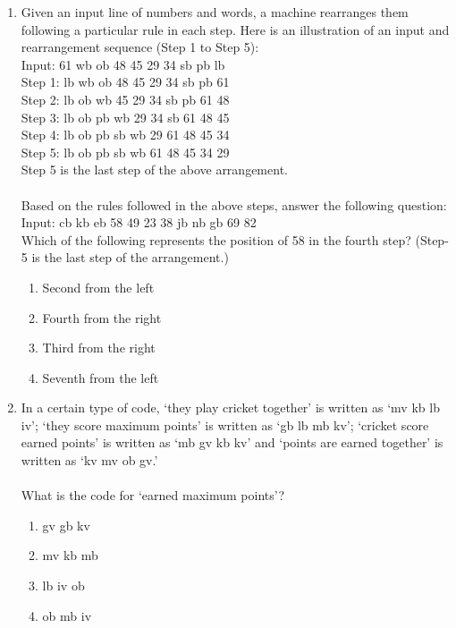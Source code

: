 \documentclass{article}
\begin{document}
\begin{enumerate}[leftmargin=*, start=18, label=Q.\arabic*.]
    \item Given an input line of numbers and words, a machine rearranges them following a particular rule in each step. Here is an illustration of an input and rearrangement sequence (Step 1 to Step 5): \\
    Input: 61 wb ob 48 45 29 34 sb pb lb \\
    Step 1: lb wb ob 48 45 29 34 sb pb 61 \\
    Step 2: lb ob wb 45 29 34 sb pb 61 48 \\
    Step 3: lb ob pb wb 29 34 sb 61 48 45 \\
    Step 4: lb ob pb sb wb 29 61 48 45 34 \\
    Step 5: lb ob pb sb wb 61 48 45 34 29 \\
    Step 5 is the last step of the above arrangement. \\  \\
    Based on the rules followed in the above steps, answer the following question: \\
    Input: cb kb eb 58 49 23 38 jb nb gb 69 82 \\
    Which of the following represents the position of 58 in the fourth step? (Step-5 is the last step of the arrangement.)
    \begin{multicols}{2}
    \begin{enumerate}
        \item Second from the left 
        \item Fourth from the right
        \item Third from the right
        \item Seventh from the left
    \end{enumerate} 
    \end{multicols}

    \item In a certain type of code, ‘they play cricket together’ is written as ‘mv kb lb iv’; ‘they score maximum points’ is written as ‘gb lb mb kv’; ‘cricket score earned points’ is written as ‘mb gv kb kv’ and ‘points are earned together’ is written as ‘kv mv ob gv.’ \\  \\ What is the code for ‘earned maximum points’?
    
    \begin{multicols}{4}
        \begin{enumerate}
            \item gv gb kv
            \item mv kb mb
            \item lb iv ob
            \item ob mb iv
        \end{enumerate}
    \end{multicols}


\end{enumerate}
\end{document}
